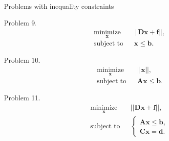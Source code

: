 \documentclass{beamer}
\begin{document}
\begin{frame}{Problems with inequality constraints}
\begin{flushleft}

Problem 9. 
%
\begin{equation}
\begin{aligned}
& \underset{\mathbf{x}}{\text{minimize}}
& & || \mathbf{D}\mathbf{x} + \mathbf{f} ||, \\
& \text{subject to}
& & \mathbf{x} \leq \mathbf{b}.
\end{aligned}
\end{equation}

Problem 10. 
%
\begin{equation}
\begin{aligned}
& \underset{\mathbf{x}}{\text{minimize}}
& & || \mathbf{x} ||, \\
& \text{subject to}
& & \mathbf{A}\mathbf{x} \leq \mathbf{b}.
\end{aligned}
\end{equation}

Problem 11. 
%
\begin{equation}
\begin{aligned}
& \underset{\mathbf{x}}{\text{minimize}}
& & || \mathbf{D}\mathbf{x} + \mathbf{f} ||, \\
& \text{subject to}
& & \begin{cases}
    \mathbf{A}\mathbf{x} \leq \mathbf{b}, \\
    \mathbf{C}\mathbf{x} = \mathbf{d}.
    \end{cases}
\end{aligned}
\end{equation}

\end{flushleft}
\end{frame}
\end{document}

